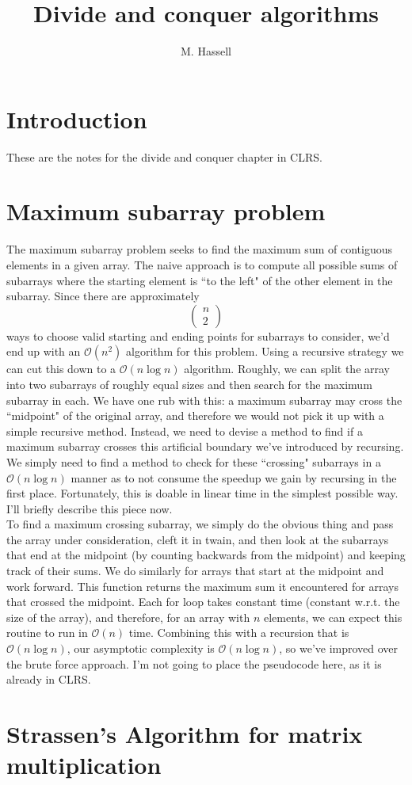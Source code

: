\documentclass[12pt,english]{article}
\title{Divide and conquer algorithms}
\author{M. Hassell}
\begin{document}
\maketitle

\section{Introduction}

These are the notes for the divide and conquer chapter in CLRS.

\section{Maximum subarray problem}

The maximum subarray problem seeks to find the maximum sum of contiguous elements in a given array.  The naive approach is to compute all possible sums of subarrays where the starting element is ``to the left" of the other element in the subarray.  Since there are approximately 
$$
\left(
\begin{array}{c}
n \\
2
\end{array}
\right)
$$ 
ways to choose valid starting and ending points for subarrays to consider, we'd end up with an $\mathcal{O}(n^2)$ algorithm for this problem.  Using a recursive strategy we can cut this down to a $\mathcal{O}( n \log n)$ algorithm.  Roughly, we can split the array into two subarrays of roughly equal sizes and then search for the maximum subarray in each.  We have one rub with this: a maximum subarray may cross the ``midpoint" of the original array, and therefore we would not pick it up with a simple recursive method.  Instead, we need to devise a method to find if a maximum subarray crosses this artificial boundary we've introduced by recursing.   We simply need to find a method to check for these ``crossing" subarrays in a $\mathcal{O}(n \log n)$ manner as to not consume the speedup we gain by recursing in the first place.  Fortunately, this is doable in linear time in the simplest possible way.  I'll briefly describe this piece now.\\

To find a maximum crossing subarray, we simply do the obvious thing and pass the array under consideration, cleft it in twain, and then look at the subarrays that end at the midpoint (by counting backwards from the midpoint) and keeping track of their sums.  We do similarly for arrays that start at the midpoint and work forward.  This function returns the maximum sum it encountered for arrays that crossed the midpoint.  Each for loop takes constant time (constant w.r.t. the size of the array), and therefore, for an array with $n$ elements, we can expect this routine to run in $\mathcal{O}(n)$ time.  Combining this with a recursion that is $\mathcal{O}(n \log n)$, our asymptotic complexity is $\mathcal{O}(n \log n)$, so we've improved over the brute force approach.  I'm not going to place the pseudocode here, as it is already in CLRS.  

\section{Strassen's Algorithm for matrix multiplication}
\end{document}
